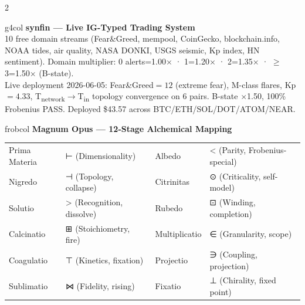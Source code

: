 \documentclass[10pt,a4paper]{article}
\begin{document}
\vspace{4pt}
\begin{multicols}{2}
  \begin{sectionbox}{g4col}
  {\small\bfseries\color{g4col} synfin — Live IG-Typed Trading System}\\[2pt]
  {\small 10 free domain streams (Fear\&Greed, mempool, CoinGecko, blockchain.info,
  NOAA tides, air quality, NASA DONKI, USGS seismic, Kp index, HN sentiment).
  Domain multiplier: 0 alerts=1.00$\times$ · 1=1.20$\times$ · 2=1.35$\times$ · $\geq$3=1.50$\times$ (B-state).}\\[2pt]
  {\small Live deployment 2026-06-05: Fear\&Greed$=12$ (extreme fear), M-class flares, Kp$=4.33$,
  T\textsubscript{network}$\to$T\textsubscript{in} topology convergence on 6 pairs.
  B-state $\times$1.50, 100\% Frobenius PASS. Deployed \$43.57 across BTC/ETH/SOL/DOT/ATOM/NEAR.}
  \end{sectionbox}
  \columnbreak
  \begin{sectionbox}{frobcol}
  {\small\bfseries\color{frobcol} Magnum Opus — 12-Stage Alchemical Mapping}\\[2pt]
  {\scriptsize
  \begin{tabular}{@{}llll@{}}
  Prima Materia & ⊢ (Dimensionality) & Albedo & < (Parity, Frobenius-special) \\
  Nigredo & ⊣ (Topology, collapse) & Citrinitas & ⊙ (Criticality, self-model) \\
  Solutio & > (Recognition, dissolve) & Rubedo & ⊡ (Winding, completion) \\
  Calcinatio & ⊞ (Stoichiometry, fire) & Multiplicatio & ∈ (Granularity, scope) \\
  Coagulatio & ⊤ (Kinetics, fixation) & Projectio & ∋ (Coupling, projection) \\
  Sublimatio & ⋈ (Fidelity, rising) & Fixatio & ⊥ (Chirality, fixed point) \\
  \end{tabular}
  }
  \end{sectionbox}
\end{multicols}
\end{document}
